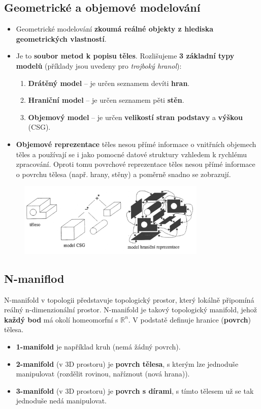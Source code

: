 
\subsection{Geometrické a objemové modelování}
\begin{itemize}
	\item Geometrické modelování \textbf{zkoumá reálné objekty z hlediska geometrických vlastností}.
	\item Je to \textbf{soubor metod k popisu těles}. Rozlišujeme \textbf{3 základní typy modelů} (příklady jsou uvedeny pro \textit{trojboký hranol}):
	\begin{enumerate}
		\item \textbf{Drátěný model} --  je určen seznamem devíti \textbf{hran}.
		\item \textbf{Hraniční model} -- je určen seznamem pěti \textbf{stěn}.
		\item \textbf{Objemový model} -- je určen \textbf{velikostí stran podstavy} a \textbf{výškou} (CSG).
	\end{enumerate}
\item \textbf{Objemové reprezentace} těles nesou přímé informace o vnitřních objemech těles a používají se i jako pomocné datové struktury vzhledem k rychlému zpracování. Oproti tomu povrchové reprezentace těles nesou přímé informace o povrchu tělesa (např. hrany, stěny) a poměrně snadno se zobrazují.
\end{itemize}

\begin{figure}[H]
	\centering
	\includegraphics[width=0.8\textwidth]{assets/4_modely}
\end{figure}

\subsection{N-maniflod}
N-manifold v topologii představuje topologický prostor, který lokálně připomíná reálný n-dimenzionální prostor. N-manifold je takový topologický manifold, jehož \textbf{každý bod} má okolí homeomorfní s $\mathbb{R}^n$. V podstatě definuje hranice (\textbf{povrch}) tělesa.
\begin{itemize}
\item \textbf{1-manifold} je například kruh (nemá žádný povrch).
\item \textbf{2-manifold} (v 3D prostoru) je \textbf{povrch tělesa}, s kterým lze jednoduše manipulovat (rozdělit rovinou, naříznout (nová hrana)).
\item \textbf{3-manifold} (v 3D prostoru) je \textbf{povrch s dírami}, s tímto tělesem už se tak jednoduše nedá manipulovat.
\end{itemize}

